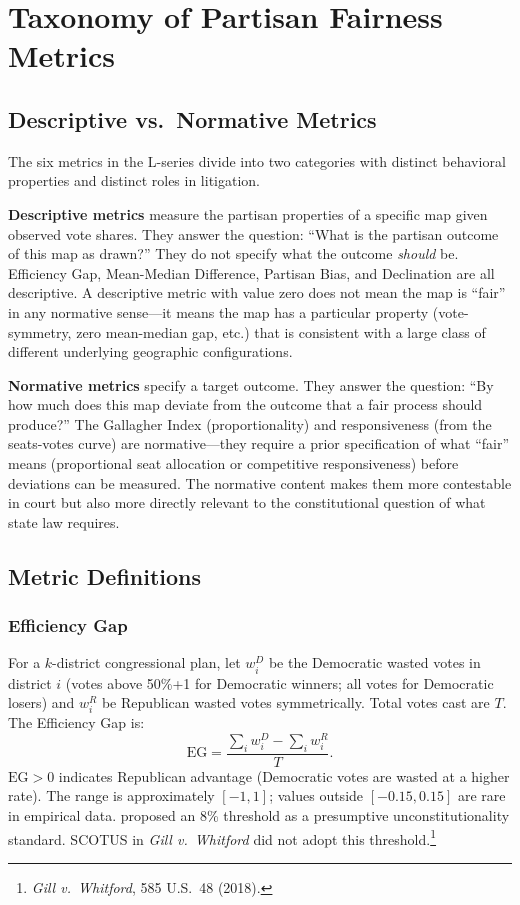 \section{Taxonomy of Partisan Fairness Metrics}
\label{sec:definition}

\subsection{Descriptive vs.\ Normative Metrics}

The six metrics in the L-series divide into two categories with distinct behavioral
properties and distinct roles in litigation.

\textbf{Descriptive metrics} measure the partisan properties of a specific map
given observed vote shares. They answer the question: ``What is the partisan
outcome of this map as drawn?'' They do not specify what the outcome \textit{should}
be. Efficiency Gap, Mean-Median Difference, Partisan Bias, and Declination are
all descriptive. A descriptive metric with value zero does not mean the map is
``fair'' in any normative sense---it means the map has a particular property
(vote-symmetry, zero mean-median gap, etc.) that is consistent with a large class
of different underlying geographic configurations.

\textbf{Normative metrics} specify a target outcome. They answer the question:
``By how much does this map deviate from the outcome that a fair process should
produce?'' The Gallagher Index (proportionality) and responsiveness (from the
seats-votes curve) are normative---they require a prior specification of what
``fair'' means (proportional seat allocation or competitive responsiveness)
before deviations can be measured. The normative content makes them more
contestable in court but also more directly relevant to the constitutional
question of what state law requires.

\subsection{Metric Definitions}

\subsubsection{Efficiency Gap}

For a $k$-district congressional plan, let $w_i^D$ be the Democratic wasted votes
in district $i$ (votes above 50\%+1 for Democratic winners; all votes for Democratic losers)
and $w_i^R$ be Republican wasted votes symmetrically. Total votes cast are $T$.
The Efficiency Gap is:
\[
\text{EG} = \frac{\sum_i w_i^D - \sum_i w_i^R}{T}.
\]
$\text{EG} > 0$ indicates Republican advantage (Democratic votes are wasted at
a higher rate). The range is approximately $[-1, 1]$; values outside $[-0.15, 0.15]$
are rare in empirical data. \citet{stephanopoulosMcGhee2015} proposed an 8\% threshold
as a presumptive unconstitutionality standard. SCOTUS in \textit{Gill v.\ Whitford}
did not adopt this threshold.\footnote{\textit{Gill v.\ Whitford}, 585 U.S.\ 48 (2018).}


